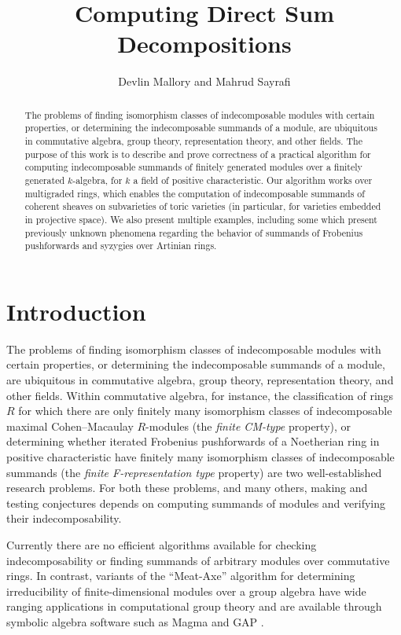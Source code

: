 \documentclass[12pt]{article}
\title{Computing Direct Sum Decompositions}
\author{Devlin Mallory and Mahrud Sayrafi}
\numberwithin{equation}{section}
\theoremstyle{theorem}
\numberwithin{thm}{section}
\theoremstyle{definition}
\begin{document}
\maketitle

\begin{abstract}
  The problems of finding isomorphism classes of indecomposable modules with certain properties, or determining the indecomposable summands of a module, are ubiquitous in commutative algebra, group theory, representation theory, and other fields. The purpose of this work is to describe and prove correctness of a practical algorithm for computing indecomposable summands of finitely generated modules over a finitely generated $k$-algebra, for $k$ a field of positive characteristic. Our algorithm works over multigraded rings, which enables the computation of indecomposable summands of coherent sheaves on subvarieties of toric varieties (in particular, for varieties embedded in projective space). We also present multiple examples, including some which present previously unknown phenomena regarding the behavior of summands of Frobenius pushforwards and syzygies over Artinian rings.
\end{abstract}



\section{Introduction}

The problems of finding isomorphism classes of indecomposable modules with certain properties, or determining the indecomposable summands of a module, are ubiquitous in commutative algebra, group theory, representation theory, and other fields. Within commutative algebra, for instance, the classification of rings $R$ for which there are only finitely many isomorphism classes of indecomposable maximal Cohen--Macaulay $R$-modules (the \emph{finite CM-type} property), or determining whether iterated Frobenius pushforwards of a Noetherian ring in positive characteristic have finitely many isomorphism classes of indecomposable summands (the \emph{finite F-representation type} property) are two well-established research problems. For both these problems, and many others, making and testing conjectures depends on computing summands of modules and verifying their indecomposability.

Currently there are no efficient algorithms available for checking indecomposability or finding summands of arbitrary modules over commutative rings. In contrast, variants of the ``Meat-Axe'' algorithm for determining irreducibility of finite-dimensional modules over a group algebra have wide ranging applications in computational group theory \cite{Parker84,HR94,Holt98} and are available through symbolic algebra software such as Magma and GAP \cite{MAGMA,GAP}.
\end{document}
